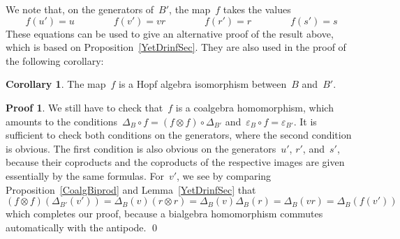 \documentclass{article}
\numberwithin{equation}{section}
\theoremstyle{definition}
\newtheorem*{cor}{Corollary}
\newtheorem*{pf}{Proof}
\theoremstyle{break}
\newcommand{\ot}{\mathbin{\otimes}}
\newcommand{\uu}{u'}
\newcommand{\vu}{v'}
\newcommand{\ru}{r'}
\newcommand{\su}{s'}
\newcommand{\Bu}{B'}
\newcommand{\1}{{(1)}}
\newcommand{\2}{{(2)}}
\newcommand{\3}{{(3)}}
\newcommand{\db}{\Delta_{B}}
\newcommand{\eb}{{\varepsilon_{B}}}
\begin{document}
We note that, on the generators of~$\Bu$, the map~$f$ takes the values
\[f(\uu) = u \qquad \qquad f(\vu) = vr \qquad \qquad f(\ru) = r \qquad \qquad f(\su) = s \]
These equations can be used to give an alternative proof of the result above, which is based on Proposition~\ref{YetDrinfSec}. They are also used in the proof of the following corollary:
\begin{cor}
The map~$f$ is a Hopf algebra isomorphism between~$B$ and~$\Bu$.
\end{cor}
\begin{pf}
We still have to check that~$f$ is a coalgebra homomorphism, which amounts to the
conditions~$\db \circ f = (f \ot f) \circ \Delta_{\Bu}$ and~$\eb \circ f = \varepsilon_{\Bu}$. It is sufficient to check both conditions on the generators, where the second condition is obvious. The first condition is also obvious on the generators~$\uu$, $\ru$, and~$\su$, because their coproducts and the coproducts of the respective images are given essentially by the same formulas. For~$\vu$, we see by comparing Proposition~\ref{CoalgBiprod} and Lemma~\ref{YetDrinfSec} that
\[(f \ot f)(\Delta_{\Bu}(\vu)) = \db(v) (r \ot r) = \db(v) \db(r) = \db(vr) = \db(f(\vu))\]
which completes our proof, because a bialgebra homomorphism commutes automatically with the antipode.
\qed
\end{pf}


\end{document}
